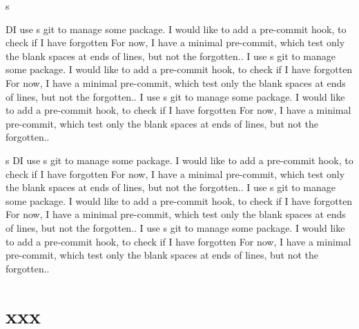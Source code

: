 \documentclass[a4paper, twoside, 12pt]{memoir}
\begin{document}
s
\newpage

\beginnumbering
\beforeeledchapter
\pstart
{}
\pend
\pstart
DI use s git to manage some package.
I would like to add a pre-commit hook, to check if I have forgotten
For now, I have a minimal pre-commit, which test only the blank spaces at ends of lines, but not the forgotten..
\pend
\pstart
{}
\pend
\pstart
{}
\pend
\pstart
{}
\pend
\pstart
{}I use s git to manage some package.
I would like to add a pre-commit hook, to check if I have forgotten
For now, I have a minimal pre-commit, which test only the blank spaces at ends of lines, but not the forgotten..
\pend
\pstart
{}
\pend
\pstart
{}I use s git to manage some package.
I would like to add a pre-commit hook, to check if I have forgotten
For now, I have a minimal pre-commit, which test only the blank spaces at ends of lines, but not the forgotten..
\pend

\beforeeledchapter
\pstart
s%
\pend
\pstart
DI use s git to manage some package.
I would like to add a pre-commit hook, to check if I have forgotten
For now, I have a minimal pre-commit, which test only the blank spaces at ends of lines, but not the forgotten..
\pend
\pstart
{}
\pend
\pstart
{}
\pend
\pstart
{}
\pend
\pstart
{}I use s git to manage some package.
I would like to add a pre-commit hook, to check if I have forgotten
For now, I have a minimal pre-commit, which test only the blank spaces at ends of lines, but not the forgotten..
\pend
\pstart
{}
\pend
\pstart
{}I use s git to manage some package.
I would like to add a pre-commit hook, to check if I have forgotten
For now, I have a minimal pre-commit, which test only the blank spaces at ends of lines, but not the forgotten..
\pend


\endnumbering

\newpage
\section*{xxx}
\end{document}
